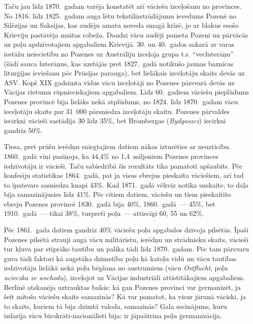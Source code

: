 \documentclass[twoside,a5paper,12pt,fleqn,openany]{extbook}
\newcommand{\pltxti}[1]{\textit{\textpolish{#1}}}
\newcommand{\detxti}[1]{\textit{\textgerman{#1}}}
\begin{document}
Taču jau līdz 1870.~gadam varēja konstatēt arī vāciešu izceļošanu no provinces. No 1816. līdz 1825.~gadam auga lētu tekstilizstrādājumu ievedums Pozenē no Silēzijas un Saksijas, kas audēju amatu noveda smagā krīzē, jo ar blakus esošo Krieviju pastāvēja muitas robeža. Daudzi vācu audēji pameta Pozeni un pārvācās uz poļu apdzīvotajiem apgabaliem Krievijā. 30. un 40.~gados sakarā ar varas iestāžu neiecietību no Pozenes uz Austrāliju izceļoja grupa t.s. ``vecluterāņu'' (šādi sauca luterāņus, kas uzstājās pret 1827.~gadā notikušo jaunas baznīcas liturģijas ieviešanu pēc Prūsijas parauga), bet lielākais izceļotāju skaits devās uz ASV. Kopš XIX gadsimta vidus vācu izceļotāji no Pozenes pārsvarā devās uz Vācijas rietumu rūpnieciskajiem apgabaliem. Līdz 60.~gadiem vāciešu pieplūdums Pozenes provincē bija lielāks nekā atplūdums, no 1824. līdz 1870.~gadam vācu ieceļotāju skaits par 31~000 pārsniedza izceļotāju skaitu. Pozenes pārvaldes iecirknī vācieši sastādīja 30 līdz 35\%, bet Brombergas (\pltxti{Bydgoszcz}) iecirknī gandrīz 50\%.

Tiesa, pret prūšu ierēdņu sniegtajiem datiem nākas izturēties ar neuzticību. 1860.~gadā viņi paziņoja, ka 44,4\% no 1,4~miljoniem Pozenes provinces iedzīvotāju ir vācieši. Taču sabiedrībā šis rezultāts tika pamatoti apšaubīts. Pēc konfesiju statistikas 1864.~gadā, pat ja visus ebrejus pieskaita vāciešiem, arī tad to īpatsvars sasniedza knapi 43\%. Kad 1871.~gadā vēlreiz notika uzskaite, to daļa bija samazinājusies līdz 41\%. Pēc citiem datiem, vāciešu un tiem pieskaitīto ebreju Pozenes provincē 1830.~gadā bija 40\%, 1860.~gadā~--- 45\%, bet 1910.~gadā~--- tikai 38\%, turpretī poļu~--- attiecīgi 60, 55 un 62\%.

Pēc 1861.~gada datiem gandrīz 40\% vāciešu poļu apgabalos dzīvoja pilsētās. Īpaši Pozenes pilsētā strauji auga vācu militāristu, ierēdņu un strādnieku skaits, vācieši tur kļuva par stiprāko tautību un palika tādi līdz 1870.~gadam. Pēc tam pārsvaru guva tādi faktori kā augstāka dzimstība poļu kā katoļu vidū un vācu tautības iedzīvotāju lielākā nekā poļu bēgšana no austrumiem (vācu \detxti{Ostflucht}, poļu \pltxti{ucieczka ze wschodu}), izceļojot uz Vācijas industriāli attīstītākajiem apgabaliem. Berlīnē atskanēja uztrauktas balsis: kā gan Pozenes provinci var ģermanizēt, ja šeit mītošo vāciešu skaits samazinās? Kā var pamatot, ka visur jārunā vāciski, ja to skaits, kuriem tā bija dzimtā valoda, samazinās? Gala secinājums, kuru izdarīja vācu birokrāti-nacionālisti bija: ir jāpaātrina poļu ģermanizācija.
\end{document}
